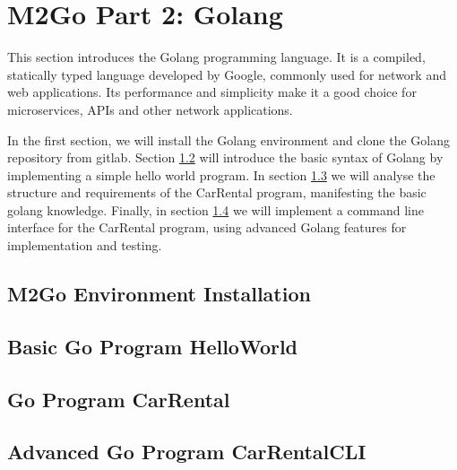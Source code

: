 \chapter{M2Go Part 2: Golang}
\label{cha:golang}
This section introduces the Golang programming language.
It is a compiled, statically typed language developed by Google, commonly used for network and web applications.
Its performance and simplicity make it a good choice for microservices, APIs and other network applications.

In the first section, we will install the Golang environment and clone the Golang repository from gitlab.
Section \ref{sec:basic_go_program} will introduce the basic syntax of Golang by implementing a simple hello world program.
In section \ref{sec:go_program_car_rental} we will analyse the structure and requirements of the CarRental program, manifesting the basic golang knowledge.
Finally, in section \ref{sec:advanced_go_program_car_rental_cli} we will implement a command line interface for the CarRental program, using advanced Golang features for implementation and testing.


\section{M2Go Environment Installation}
\label{sec:m2go_env_installation}




\section{Basic Go Program HelloWorld}
\label{sec:basic_go_program}



\section{Go Program CarRental}
\label{sec:go_program_car_rental}





\section{Advanced Go Program CarRentalCLI}
\label{sec:advanced_go_program_car_rental_cli}



